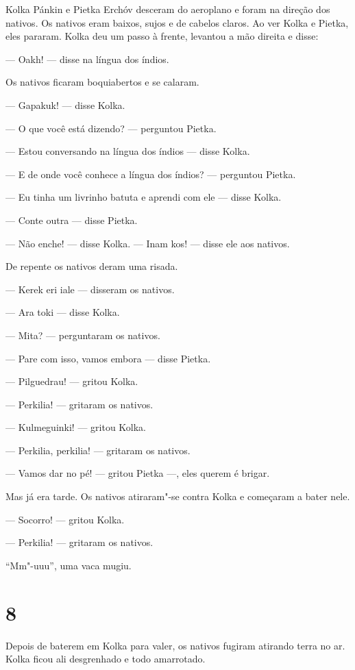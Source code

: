 Kolka Pánkin e Pietka Erchóv desceram do aeroplano e foram na direção
dos nativos. Os nativos eram baixos, sujos e de cabelos claros. Ao ver
Kolka e Pietka, eles pararam. Kolka deu um passo à frente,
levantou a mão direita e disse:

--- Oakh! --- disse na língua dos índios.

Os nativos ficaram boquiabertos e se calaram.

--- Gapakuk! --- disse Kolka.

--- O que você está dizendo? --- perguntou Pietka.

--- Estou conversando na língua dos índios --- disse Kolka.

--- E de onde você conhece a língua dos índios? --- perguntou Pietka.

--- Eu tinha um livrinho batuta e aprendi com ele --- disse Kolka.

--- Conte outra --- disse Pietka.

--- Não enche! --- disse Kolka. --- Inam kos! --- disse ele aos
nativos.

De repente os nativos deram uma risada.

--- Kerek eri iale --- disseram os nativos.

--- Ara toki --- disse Kolka.

--- Mita? --- perguntaram os nativos.

--- Pare com isso, vamos embora --- disse Pietka.

--- Pilguedrau! --- gritou Kolka.

--- Perkilia! --- gritaram os nativos.

--- Kulmeguinki! --- gritou Kolka.

--- Perkilia, perkilia! --- gritaram os nativos.

--- Vamos dar no pé! --- gritou Pietka ---, eles querem é brigar.

Mas já era tarde. Os nativos atiraram"-se contra Kolka e começaram a
bater nele.

--- Socorro! --- gritou Kolka.

--- Perkilia! --- gritaram os nativos.

``Mm"-uuu'', uma vaca mugiu.

\section{8}

Depois de baterem em Kolka para valer, os nativos fugiram atirando terra
no ar. Kolka ficou ali desgrenhado e todo amarrotado.

